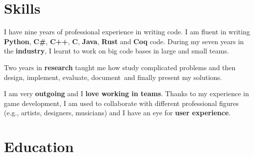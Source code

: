 \documentclass[letterpaper]{twentysecondcv} %
\begin{document}

\makeprofile %


\section{Skills}

I have nine years of professional experience in writing code. I am fluent in writing \textbf{Python}, \textbf{C\#}, \textbf{C++}, \textbf{C}, \textbf{Java}, \textbf{Rust} and \textbf{Coq} code. During my seven years in the \textbf{industry}, I learnt to work on big code bases in large and small teams.

Two years in \textbf{research} taught me how study complicated problems and then design, implement, evaluate, document and finally present my solutions.

I am very \textbf{outgoing} and I \textbf{love working in teams}. Thanks to my experience in game development, I am used to collaborate with different professional figures (e.g., artists, designers, musicians) and I have an eye for \textbf{user experience}.\\





\section{Education}

\begin{twenty} %
\end{twenty}
\end{document}
